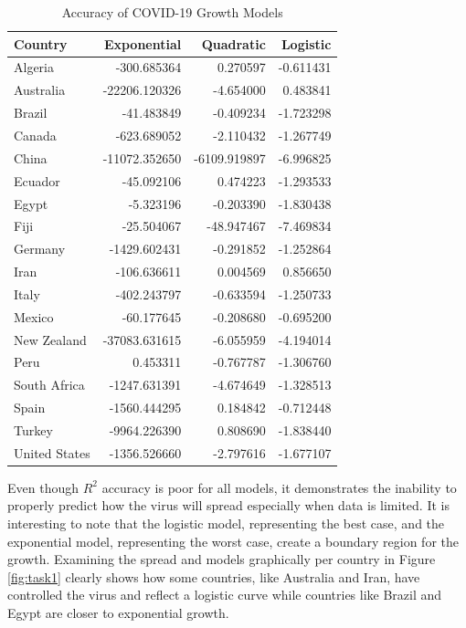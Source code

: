 \documentclass{homework}
\begin{document}
\begin{table}[H]
  \caption{Accuracy of COVID-19 Growth Models}
  \label{Task 1 Results}
  \centering
  \begin{tabular}{lrrr}
    \toprule
    Country       & Exponential   & Quadratic    & Logistic  \\
    \midrule
    Algeria       & -300.685364   & 0.270597     & -0.611431 \\
    Australia     & -22206.120326 & -4.654000    & 0.483841  \\
    Brazil        & -41.483849    & -0.409234    & -1.723298 \\
    Canada        & -623.689052   & -2.110432    & -1.267749 \\
    China         & -11072.352650 & -6109.919897 & -6.996825 \\
    Ecuador       & -45.092106    & 0.474223     & -1.293533 \\
    Egypt         & -5.323196     & -0.203390    & -1.830438 \\
    Fiji          & -25.504067    & -48.947467   & -7.469834 \\
    Germany       & -1429.602431  & -0.291852    & -1.252864 \\
    Iran          & -106.636611   & 0.004569     & 0.856650  \\
    Italy         & -402.243797   & -0.633594    & -1.250733 \\
    Mexico        & -60.177645    & -0.208680    & -0.695200 \\
    New Zealand   & -37083.631615 & -6.055959    & -4.194014 \\
    Peru          & 0.453311      & -0.767787    & -1.306760 \\
    South Africa  & -1247.631391  & -4.674649    & -1.328513 \\
    Spain         & -1560.444295  & 0.184842     & -0.712448 \\
    Turkey        & -9964.226390  & 0.808690     & -1.838440 \\
    United States & -1356.526660  & -2.797616    & -1.677107 \\
    \bottomrule
  \end{tabular}
\end{table}

Even though $R^2$ accuracy is poor for all models, it demonstrates the inability to properly predict how the virus will spread especially when data is limited. It is interesting to note that the logistic model, representing the best case, and the exponential model, representing the worst case, create a boundary region for the growth. Examining the spread and models graphically per country in Figure \ref{fig:task1} clearly shows how some countries, like Australia and Iran, have controlled the virus and reflect a logistic curve while countries like Brazil and Egypt are closer to exponential growth.
\end{document}
